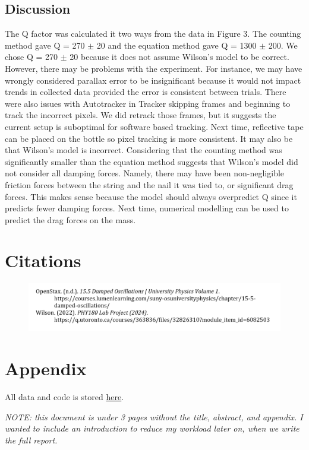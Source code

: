 \documentclass[notitlepage,twocolumn, 12pt]{report}
\begin{document}
    \subsection{Discussion}
    The Q factor was calculated it two ways from the data in Figure 3. The counting method gave Q = 270 $\pm$ 20 and the equation method gave Q = 1300 $\pm$ 200. We chose Q = 270 $\pm$ 20 because it does not assume Wilson's model to be correct. However, there may be problems with the experiment. For instance, we may have wrongly considered parallax error to be insignificant because it would not impact trends in collected data provided the error is consistent between trials. There were also issues with Autotracker in Tracker skipping frames and beginning to track the incorrect pixels. We did retrack those frames, but it suggests the current setup is suboptimal for software based tracking. Next time, reflective tape can be placed on the bottle so pixel tracking is more consistent. 
    It may also be that Wilson's model is incorrect. Considering that the counting method was significantly smaller than the equation method suggests that Wilson's model did not consider all damping forces. Namely, there may have been non-negligible friction forces between the string and the nail it was tied to, or significant drag forces. This makes sense because the model should always overpredict Q since it predicts fewer damping forces. Next time, numerical modelling can be used to predict the drag forces on the mass.

    \section{Citations}
    \begin{figure}[H]
        \includegraphics[width=\linewidth]{citations.png}
    \end{figure}

    \section{Appendix}
    All data and code is stored \href{https://github.com/PRU1/PHY180-pendulum-project}{here}.



    \textit{NOTE: this document is under 3 pages without the title, abstract, and appendix. I wanted to include an introduction to reduce my workload later on, when we write the full report.}
\end{document}

